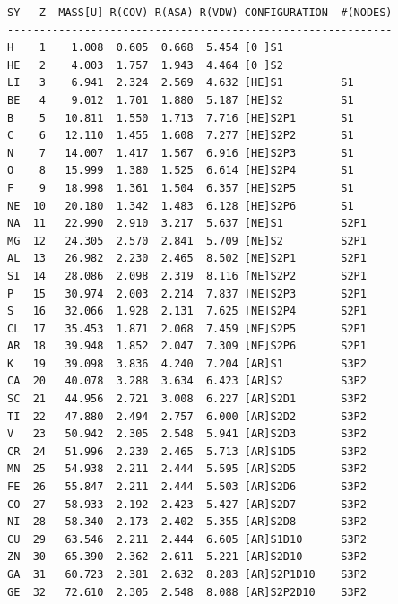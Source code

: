 \documentclass[final,12pt]{article}
\begin{document}
\small
\begin{verbatim}
SY   Z  MASS[U] R(COV) R(ASA) R(VDW) CONFIGURATION  #(NODES)
------------------------------------------------------------
H    1    1.008  0.605  0.668  5.454 [0 ]S1                   
HE   2    4.003  1.757  1.943  4.464 [0 ]S2                   
LI   3    6.941  2.324  2.569  4.632 [HE]S1         S1        
BE   4    9.012  1.701  1.880  5.187 [HE]S2         S1        
B    5   10.811  1.550  1.713  7.716 [HE]S2P1       S1        
C    6   12.110  1.455  1.608  7.277 [HE]S2P2       S1        
N    7   14.007  1.417  1.567  6.916 [HE]S2P3       S1        
O    8   15.999  1.380  1.525  6.614 [HE]S2P4       S1        
F    9   18.998  1.361  1.504  6.357 [HE]S2P5       S1        
NE  10   20.180  1.342  1.483  6.128 [HE]S2P6       S1        
NA  11   22.990  2.910  3.217  5.637 [NE]S1         S2P1      
MG  12   24.305  2.570  2.841  5.709 [NE]S2         S2P1      
AL  13   26.982  2.230  2.465  8.502 [NE]S2P1       S2P1      
SI  14   28.086  2.098  2.319  8.116 [NE]S2P2       S2P1      
P   15   30.974  2.003  2.214  7.837 [NE]S2P3       S2P1      
S   16   32.066  1.928  2.131  7.625 [NE]S2P4       S2P1      
CL  17   35.453  1.871  2.068  7.459 [NE]S2P5       S2P1      
AR  18   39.948  1.852  2.047  7.309 [NE]S2P6       S2P1      
K   19   39.098  3.836  4.240  7.204 [AR]S1         S3P2      
CA  20   40.078  3.288  3.634  6.423 [AR]S2         S3P2      
SC  21   44.956  2.721  3.008  6.227 [AR]S2D1       S3P2      
TI  22   47.880  2.494  2.757  6.000 [AR]S2D2       S3P2      
V   23   50.942  2.305  2.548  5.941 [AR]S2D3       S3P2      
CR  24   51.996  2.230  2.465  5.713 [AR]S1D5       S3P2      
MN  25   54.938  2.211  2.444  5.595 [AR]S2D5       S3P2      
FE  26   55.847  2.211  2.444  5.503 [AR]S2D6       S3P2      
CO  27   58.933  2.192  2.423  5.427 [AR]S2D7       S3P2      
NI  28   58.340  2.173  2.402  5.355 [AR]S2D8       S3P2      
CU  29   63.546  2.211  2.444  6.605 [AR]S1D10      S3P2      
ZN  30   65.390  2.362  2.611  5.221 [AR]S2D10      S3P2      
GA  31   60.723  2.381  2.632  8.283 [AR]S2P1D10    S3P2      
GE  32   72.610  2.305  2.548  8.088 [AR]S2P2D10    S3P2      
\end{verbatim}
\newpage
\end{document}
